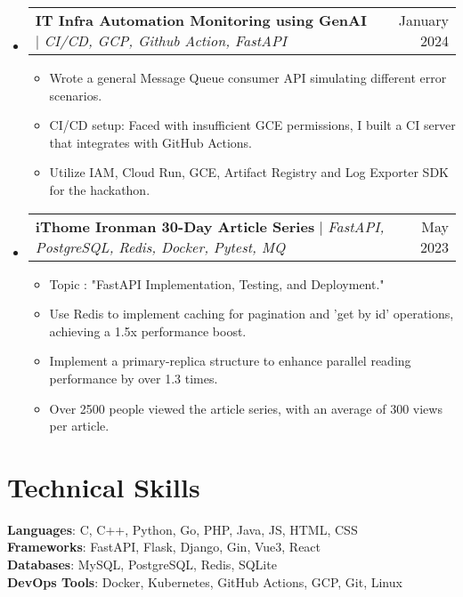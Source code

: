 \documentclass[letterpaper,11pt]{article}
\makeatletter
\newcommand{\resumeItem}[1]{
  \item\small{
    {#1 \vspace{-2pt}}
  }
}
\newcommand{\resumeProjectHeading}[2]{
    \item
    \begin{tabular*}{0.97\textwidth}{l@{\extracolsep{\fill}}r}
      \small#1 & #2 \\
    \end{tabular*}\vspace{-7pt}
}
\newcommand{\resumeSubHeadingListStart}{\begin{itemize}[leftmargin=0.15in, label={}]}
\newcommand{\resumeSubHeadingListEnd}{\end{itemize}}
\newcommand{\resumeItemListStart}{\begin{itemize}}
\newcommand{\resumeItemListEnd}{\end{itemize}\vspace{-5pt}}
\makeatother
\begin{document}
    \resumeSubHeadingListStart
      \resumeProjectHeading
      {\textbf{IT Infra Automation Monitoring using GenAI} $|$ \emph{CI/CD, GCP, Github Action, FastAPI}}{January 2024}
      \resumeItemListStart
        \resumeItem{Wrote a general Message Queue consumer API simulating different error scenarios.}
        \resumeItem{CI/CD setup: Faced with insufficient GCE permissions, I built a CI server that integrates with GitHub Actions.}
        \resumeItem{Utilize IAM, Cloud Run, GCE, Artifact Registry and Log Exporter SDK for the hackathon.}
      \resumeItemListEnd
      \resumeProjectHeading
          {\textbf{iThome Ironman 30-Day Article Series} $|$ \emph{FastAPI, PostgreSQL, Redis, Docker, Pytest, MQ}}{May 2023}
          \resumeItemListStart
            \resumeItem{Topic : "FastAPI Implementation, Testing, and Deployment."}
            \resumeItem{Use Redis to implement caching for pagination and 'get by id' operations, achieving a 1.5x performance boost.}
            \resumeItem{Implement a primary-replica structure to enhance parallel reading performance by over 1.3 times.}
            \resumeItem{Over 2500 people viewed the article series, with an average of 300 views per article.}
          \resumeItemListEnd

    \resumeSubHeadingListEnd


%
\section{Technical Skills}
 \begin{itemize}[leftmargin=0.15in, label={}]
    \small{\item{
     \textbf{Languages}{: C, C++, Python, Go, PHP, Java, JS, HTML, CSS} \\
     \textbf{Frameworks}{: FastAPI, Flask, Django, Gin, Vue3, React} \\
     \textbf{Databases}{: MySQL, PostgreSQL, Redis, SQLite } \\
     \textbf{DevOps Tools}{: Docker, Kubernetes, GitHub Actions, GCP, Git, Linux}
    }}
 \end{itemize}


\end{document}
